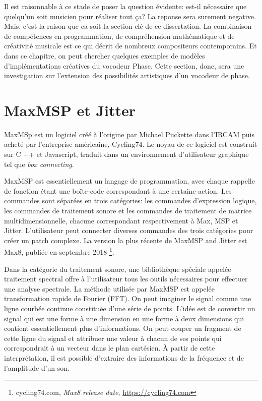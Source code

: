 Il est raisonnable à ce stade de poser la question évidente: est-il nécessaire que quelqu’un soit musicien pour réaliser tout ça? La reponse sera surement negative. Mais, c'est la raison que ca soit la section clé de ce dissertation. La combinaison de compétences en programmation, de compréhension mathématique et de créativité musicale est ce qui décrit de nombreux compositeurs contemporains. Et dans ce chapitre, on peut chercher quelques exemples de modèles d'implémentations créatives du vocodeur Phase. Cette section, donc, sera une investigation sur l’extension des possibilités artistiques d’un vocodeur de phase.

\section{MaxMSP et Jitter}

MaxMSp est un logiciel créé à l'origine par Michael Puckette dans l'IRCAM puis acheté par l’entreprise américaine, Cycling74. Le noyau de ce logiciel est construit sur C ++ et Javascript, traduit dans un environnement d’utilisateur graphique tel que \textit{box connecting}.

MaxMSP est essentiellement un langage de programmation, avec chaque rappelle de fonction étant une boîte-code correspondant à une certaine action. Les commandes sont séparées en trois catégories: les commandes d'expression logique, les commandes de traitement sonore et les commandes de traitement de matrice multidimensionnelle, chacune correspondant respectivement à Max, MSP et Jitter. L'utilisateur peut connecter diverses commandes des trois catégories pour créer un patch complexe. La version la plus récente de MaxMSP and Jitter est Max8, publiée en septembre 2018 \footnote{cycling74.com, \textit{Max8 release date}, \href{https://cycling74.com}{https://cycling74.com} \nocite{cycling74}}.

Dans la catégorie du traitement sonore, une bibliothèque spéciale appelée traitement spectral offre à l'utilisateur tous les outils nécessaires pour effectuer une analyse spectrale. La méthode utilisée par MaxMSP est appelée transformation rapide de Fourier (FFT). On peut imaginer le signal comme une ligne courbée continue constituée d’une série de points. L'idée est de convertir un signal qui est une forme à une dimension en une forme à deux dimensions qui contient essentiellement plus d'informations. On peut couper un fragment de cette ligne du signal et attribuer une valeur à chacun de ses points qui correspondrait à un vecteur dans le plan cartésien. À partir de cette interprétation, il est possible d'extraire des informations de la fréquence et de l'amplitude d’un son.

